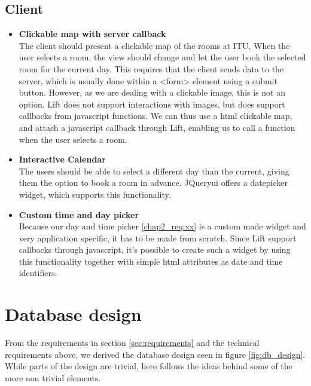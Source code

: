 \subsection{Client}
\label{sub:req_client}
\begin{itemize}
	\item \textbf{Clickable map with server callback}\\
	The client should present a clickable map of the rooms at ITU. When the user selects a room, the view should change and let the user book the selected room for the current day. This requires that the client sends data to the server, which is usually done within a <form> element using a submit button. However, as we are dealing with a clickable image, this is not an option. Lift does not support interactions with images, but does support callbacks from javascript functions. We can thus use a html clickable map\cite{html_map}, and attach a javascript callback through Lift, enabling us to call a function when the user selects a room.
	\item \textbf{Interactive Calendar}\\
	The users should be able to select a different day than the current, giving them the option to book a room in advance. JQueryui\cite{jqueryui} offers a datepicker widget\cite{jqueryui_date}, which supports this functionality.
	\item \textbf{Custom time and day picker}\\
	Because our day and time picker \ref{chap2_req:xx} is a custom made widget and very application specific, it has to be made from scratch. Since Lift support callbacks through javascript, it's possible to create such a widget by using this functionality together with simple html attributes as date and time identifiers.
\end{itemize}

\section{Database design}
\label{sec:database_design}
From the requirements in section \ref{sec:requirements} and the technical requirements above, we derived the database design seen in figure \ref{fig:db_design}. While parts of the design are trivial, here follows the ideas behind some of the more non trivial elements.


